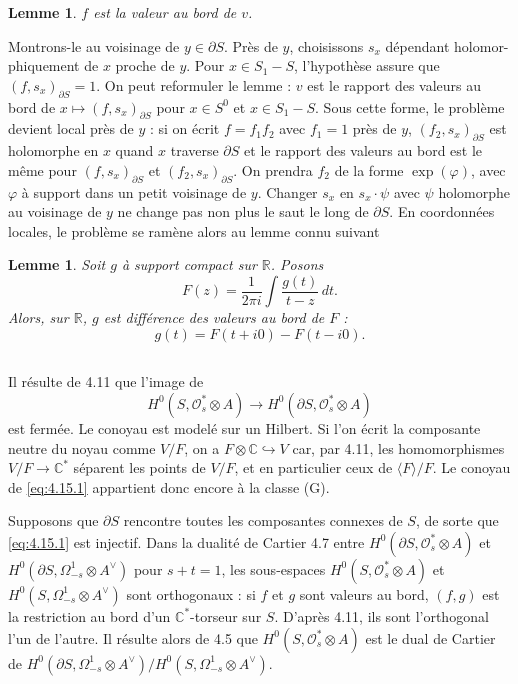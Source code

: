 \documentclass[12pt,a4paper]{article}
\theoremstyle{plain}
\newtheorem{lemma}[theorem]{Lemme}
\theoremstyle{definition}
\theoremstyle{remark}
\newcommand{\cO}{\mathcal{O}}
\newcommand{\C}{\mathbb{C}}
\newcommand{\R}{\mathbb{R}}
\providecommand{\cO}{\mathcal{O}}
\providecommand{\R}{\mathrm{R}}
\begin{document}
\begin{lemma}
$f$ est la valeur au bord de $v$.
\end{lemma}

Montrons-le au voisinage de $y \in \partial S$. Près de $y$, choisissons $s_x$ dépendant holomor-
phiquement de $x$ proche de $y$. Pour $x \in S_1 - S$, l'hypothèse assure que $(f, s_x)_{\partial S} = 1$.
On peut reformuler le lemme : $v$ est le rapport des valeurs au bord de $x \mapsto (f, s_x)_{\partial S}$
pour $x \in S^0$ et $x \in S_1 - S$. Sous cette forme, le problème devient local près de $y$ : si on
écrit $f = f_1 f_2$ avec $f_1 = 1$ près de $y$, $(f_2, s_x)_{\partial S}$ est holomorphe en $x$ quand $x$ traverse
$\partial S$ et le rapport des valeurs au bord est le même pour $(f, s_x)_{\partial S}$ et $(f_2, s_x)_{\partial S}$. On
prendra $f_2$ de la forme $\exp(\varphi)$, avec $\varphi$ à support dans un petit voisinage de $y$. Changer
$s_x$ en $s_x \cdot \psi$ avec $\psi$ holomorphe au voisinage de $y$ ne change pas non plus le saut le long
de $\partial S$. En coordonnées locales, le problème se ramène alors au lemme connu suivant

\begin{lemma}
Soit $g$ à support compact sur $\R$. Posons
\[
F(z) = \frac{1}{2\pi i} \int \frac{g(t)}{t - z} \, dt.
\]
Alors, sur $\R$, $g$ est différence des valeurs au bord de $F$ :
\[
g(t) = F(t + i0) - F(t - i0).
\]
\end{lemma}

\subsection{}

Il résulte de 4.11 que l'image de
\begin{equation}\label{eq:4.15.1}
H^0(S, \cO_s^* \otimes A) \to H^0(\partial S, \cO_s^* \otimes A)
\end{equation}
est fermée. Le conoyau est modelé sur un Hilbert. Si l'on écrit la composante neutre
du noyau comme $V/F$, on a $F \otimes \C \hookrightarrow V$ car, par 4.11, les homomorphismes $V/F \to \C^*$
séparent les points de $V/F$, et en particulier ceux de $\langle F \rangle/F$. Le conoyau de \eqref{eq:4.15.1}
appartient donc encore à la classe (G).

\begin{scholie}
Supposons que $\partial S$ rencontre toutes les composantes connexes de $S$,
de sorte que \eqref{eq:4.15.1} est injectif. Dans la dualité de Cartier 4.7 entre $H^0(\partial S, \cO_s^* \otimes A)$
et $H^0(\partial S, \Omega^1_{-s} \otimes A^\vee)$ pour $s + t = 1$, les sous-espaces $H^0(S, \cO_s^* \otimes A)$ et $H^0(S, \Omega^1_{-s} \otimes A^\vee)$
sont orthogonaux : si $f$ et $g$ sont valeurs au bord, $(f,g)$ est la restriction au bord d'un
$\C^*$-torseur sur $S$. D'après 4.11, ils sont l'orthogonal l'un de l'autre. Il résulte alors de 4.5
que $H^0(S, \cO_s^* \otimes A)$ est le dual de Cartier de $H^0(\partial S, \Omega^1_{-s} \otimes A^\vee)/H^0(S, \Omega^1_{-s} \otimes A^\vee)$.
\end{scholie}
\end{document}

